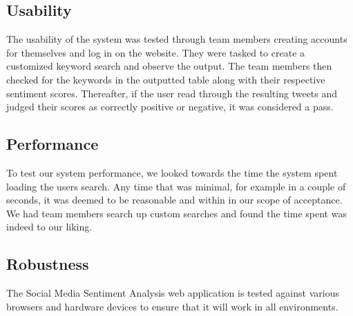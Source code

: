 \documentclass[12pt]{article}
\begin{document}
\subsection{Usability}
The usability of the system was tested through team members creating accounts for themselves and log in on the website. They were tasked to create a customized keyword search and observe the output. The team members then checked for the keywords in the outputted table along with their respective sentiment scores. Thereafter, if the user read through the resulting tweets and judged their scores as correctly positive or negative, it was considered a pass.\\

\subsection{Performance}
To test our system performance, we looked towards the time the system spent loading the users search. Any time that was minimal, for example in a couple of seconds, it was deemed to be reasonable and within in our scope of acceptance. We had team members search up custom searches and found the time spent was indeed to our liking.\\

\pagebreak

\subsection{Robustness}
The Social Media Sentiment Analysis web application is tested against various browsers and hardware devices to ensure that it will work in all environments.
\end{document}
